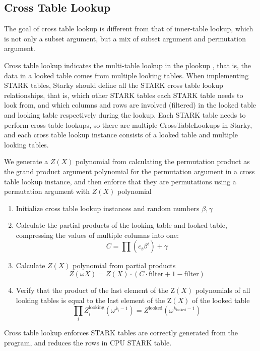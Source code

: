 \subsection{Cross Table Lookup}\label{section: cross-table-lookup}

The goal of cross table lookup is different from that of inner-table lookup, which is not only a subset argument, but a mix of subset argument and permutation argument.

Cross table lookup indicates the multi-table lookup in the plookup \cite{cryptoeprint:2020/315,}, that is, the data in a looked table comes from multiple looking tables. When implementing STARK tables, Starky should define all the STARK cross table lookup relationships, that is, which other STARK tables each STARK table needs to look from, and which columns and rows are involved (filtered) in the looked table and looking table respectively during the lookup. Each STARK table needs to perform cross table lookups, so there are multiple CrossTableLookups in Starky, and each cross table lookup instance consists of a looked table and multiple looking tables.

We generate a $Z(X)$ polynomial from calculating the permutation product as the grand product argument polynomial for the permutation argument in a cross table lookup instance, and then enforce that they are permutations using a permutation argument with $Z(X)$ polynomial

\begin{enumerate}
    \item Initialize cross table lookup instances and random numbers $\beta, \gamma$
    \item Calculate the partial products of the looking table and looked table, compressing the values of multiple columns into one:$$C = \prod(c_i \beta^i) + \gamma$$
    \item Calculate $Z(X)$ polynomial from partial products $$Z(\omega X) = Z(X)\cdot (C \cdot \text{filter} + 1 - \text{filter})$$
    \item Verify that the product of the last element of the Z$(X)$ polynomials of all looking tables is equal to the last element of the Z$(X)$ of the looked table
    $$\prod_i Z^{\text{looking}}_i(\omega^{k_i-1}) = Z^{\text{looked}}(\omega^{k_{\text{looked}}-1})$$
\end{enumerate}

Cross table lookup enforces STARK tables are correctly generated from the program, and reduces the rows in CPU STARK table.
